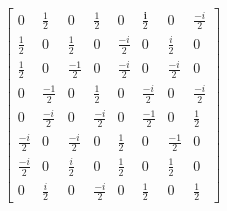 \documentclass{standalone}
\begin{document}
\begin{varwidth}{\linewidth}
\begin{align*}
\left[\begin{array}{cccccccc}
0 & \frac{1}{2} & 0 & \frac{1}{2} & 0 & \frac{\bm{i}}{2} & 0 & \frac{-i}{2} \\
\frac{1}{2} & 0 & \frac{1}{2} & 0 & \frac{-i}{2} & 0 & \frac{i}{2} & 0 \\
\frac{1}{2} & 0 & \frac{-1}{2} & 0 & \frac{-i}{2} & 0 & \frac{-i}{2} & 0 \\
0 & \frac{-1}{2} & 0 & \frac{1}{2} & 0 & \frac{-i}{2} & 0 & \frac{-i}{2} \\
0 & \frac{-i}{2} & 0 & \frac{-i}{2} & 0 & \frac{-1}{2} & 0 & \frac{1}{2} \\
\frac{-i}{2} & 0 & \frac{-i}{2} & 0 & \frac{1}{2} & 0 & \frac{-1}{2} & 0 \\
\frac{-i}{2} & 0 & \frac{i}{2} & 0 & \frac{1}{2} & 0 & \frac{1}{2} & 0 \\
0 & \frac{i}{2} & 0 & \frac{-i}{2} & 0 & \frac{1}{2} & 0 & \frac{1}{2}
\end{array}\right]
\end{align*}
\end{varwidth}
\end{document}
